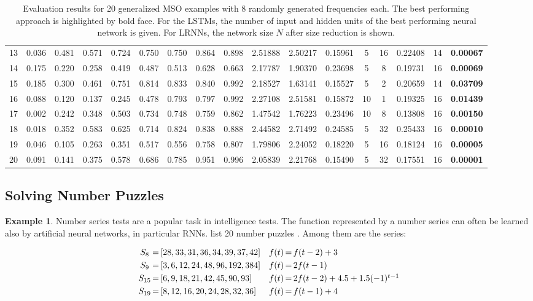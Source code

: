 \documentclass[twoside,11pt]{article}
\theoremstyle{definition}
\newtheorem{exmp}{Example}
\begin{document}
\begin{table}
\begin{tabular}{c*{8}{p{8mm}}cccc@{\,+\,}cccc}
	13 & 0.036 & 0.481 & 0.571 & 0.724 & 0.750 & 0.750 & 0.864 & 0.898 & 2.51888 & 2.50217 & 0.15961 & 5 & 16 & 0.22408 & 14 & \textbf{0.00067}\\
	14 & 0.175 & 0.220 & 0.258 & 0.419 & 0.487 & 0.513 & 0.628 & 0.663 & 2.17787 & 1.90370 & 0.23698 & 5 & 8 & 0.19731 & 16 & \textbf{0.00069}\\
	15 & 0.185 & 0.300 & 0.461 & 0.751 & 0.814 & 0.833 & 0.840 & 0.992 & 2.18527 & 1.63141 & 0.15527 & 5 & 2 & 0.20659 & 14 & \textbf{0.03709}\\
	16 & 0.088 & 0.120 & 0.137 & 0.245 & 0.478 & 0.793 & 0.797 & 0.992 & 2.27108 & 2.51581 & 0.15872 & 10 & 1 & 0.19325 & 16 & \textbf{0.01439}\\
	17 & 0.002 & 0.242 & 0.348 & 0.503 & 0.734 & 0.748 & 0.759 & 0.862 & 1.47542 & 1.76223 & 0.23496 & 10 & 8 & 0.13808 & 16 & \textbf{0.00150}\\
	18 & 0.018 & 0.352 & 0.583 & 0.625 & 0.714 & 0.824 & 0.838 & 0.888 & 2.44582 & 2.71492 & 0.24585 & 5 & 32 & 0.25433 & 16 & \textbf{0.00010}\\
	19 & 0.046 & 0.105 & 0.263 & 0.351 & 0.517 & 0.556 & 0.758 & 0.807 & 1.79806 & 2.24052 & 0.18220 & 5 & 16 & 0.18124 & 16 & \textbf{0.00005}\\
	20 & 0.091 & 0.141 & 0.375 & 0.578 & 0.686 & 0.785 & 0.951 & 0.996 & 2.05839 & 2.21768 & 0.15490 & 5 & 32 & 0.17551 & 16 & \textbf{0.00001}\\
	\bottomrule
  \end{tabular}
\caption{Evaluation results for 20 generalized MSO examples with 8 randomly
generated frequencies each. The best performing approach is highlighted by bold
face. For the LSTMs, the number of input and hidden units of the best performing
neural network is given. For LRNNs, the network size $N$ after size reduction is
shown.}
\label{sideways}
\end{table}

\subsection{Solving Number Puzzles}

\begin{exmp}
Number series tests are a popular task in intelligence tests. The function
represented by a number series can often be learned also by artificial neural
networks, in particular RNNs. \citet{GW13} list 20 number puzzles \citep[cf.][]{RK11}.
Among them are the series:

\[ \begin{array}{c@{\,=\,}lc@{\,=\,}l}
	S_8 & [28,33,31,36,34,39,37,42] & f(t) & f(t-2) + 3\\[3pt]
	S_9 & [3,6,12,24,48,96,192,384] & f(t) & 2 f(t-1)\\[3pt]
	S_{15} & [6,9,18,21,42,45,90,93] & f(t) & 2 f(t-2) + 4.5 + 1.5 (-1)^{t-1}\\[3pt]
	S_{19} & [8,12,16,20,24,28,32,36] & f(t) & f(t-1) + 4
\end{array} \]
\end{exmp}
\end{document}
